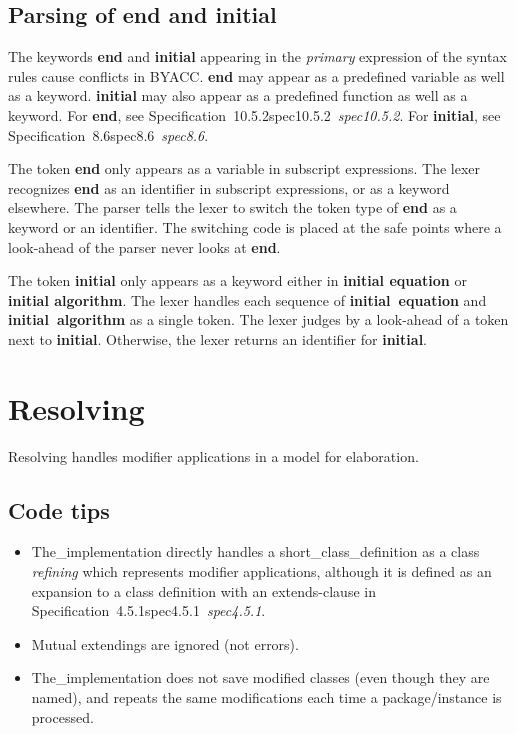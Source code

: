 \documentclass[10pt,b5paper]{article}
\def\specrefx#1#2{Specification~#1\ifx\relax#2\relax{}\else~{\it{}#2}\fi}
\def\specref#1{\specrefx{#1}{\csname spec#1\endcsname}}
\begin{document}

\subsection{Parsing of {\bf{}end} and {\bf{}initial}}

The keywords {\bf{}end} and {\bf{}initial} appearing in the
{\it{}primary\/} expression of the syntax rules cause conflicts in
BYACC\@.  {\bf{}end} may appear as a predefined variable as well as a
keyword.  {\bf{}initial} may also appear as a predefined function as
well as a keyword.  For {\bf{}end}, see \specref{10.5.2}.  For
{\bf{}initial}, see \specref{8.6}.

The token {\bf{}end} only appears as a variable in subscript
expressions.  The lexer recognizes {\bf{}end} as an identifier in
subscript expressions, or as a keyword elsewhere.  The parser tells
the lexer to switch the token type of {\bf{}end} as a keyword or an
identifier.  The switching code is placed at the safe points where a
look-ahead of the parser never looks at {\bf{}end}.

The token {\bf{}initial} only appears as a keyword either in
{\bf{}initial equation} or {\bf{}initial algorithm}.  The lexer
handles each sequence of {\bf{}initial~equation} and
{\bf{}initial~algorithm} as a single token.  The lexer judges by a
look-ahead of a token next to {\bf{}initial}.  Otherwise, the lexer
returns an identifier for {\bf{}initial}.


\section{Resolving}

Resolving handles modifier applications in a model for elaboration.


\subsection{Code tips}

\begin{itemize}

\item The_implementation directly handles a short_class_definition as
a class {\it{}refining\/} which represents modifier applications,
although it is defined as an expansion to a class definition with an
extends-clause in \specref{4.5.1}.

\item Mutual extendings are ignored (not errors).

\item The_implementation does not save modified classes (even though
they are named), and repeats the same modifications each time a
package/instance is processed.


\end{itemize}
\end{document}
